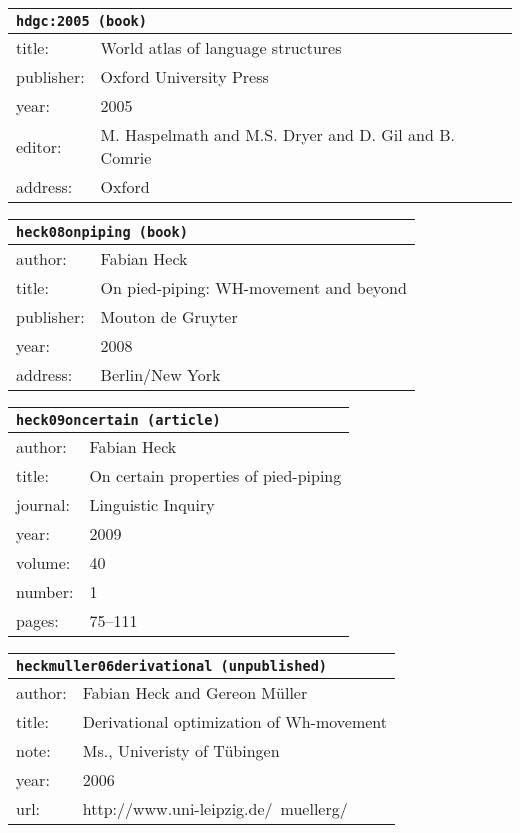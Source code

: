 \documentclass{article}
\begin{document}
\bigskip

\begin{tabular}{p{}p{}}
\multicolumn{2}{l}{\texttt{hdgc:2005 (book)}}\\
\hline
title: & World atlas of language structures\\
publisher: & Oxford University Press\\
year: & 2005\\
editor: & M. Haspelmath and M.S. Dryer and D. Gil and B. Comrie\\
address: & Oxford\\
\end{tabular}

\bigskip

\begin{tabular}{p{}p{}}
\multicolumn{2}{l}{\texttt{heck08onpiping (book)}}\\
\hline
author: & Fabian Heck\\
title: & On pied-piping: WH-movement and beyond\\
publisher: & Mouton de Gruyter\\
year: & 2008\\
address: & Berlin/New York\\
\end{tabular}

\bigskip

\begin{tabular}{p{}p{}}
\multicolumn{2}{l}{\texttt{heck09oncertain (article)}}\\
\hline
author: & Fabian Heck\\
title: & On certain properties of pied-piping\\
journal: & Linguistic Inquiry\\
year: & 2009\\
volume: & 40\\
number: & 1\\
pages: & 75--111\\
\end{tabular}

\bigskip

\begin{tabular}{p{}p{}}
\multicolumn{2}{l}{\texttt{heckmuller06derivational (unpublished)}}\\
\hline
author: & Fabian Heck and Gereon M{\"u}ller\\
title: & Derivational optimization of Wh-movement\\
note: & \textsc{M}s., Univeristy of T{\"u}bingen\\
year: & 2006\\
url: & http://www.uni-leipzig.de/~muellerg/\\
\end{tabular}
\end{document}
